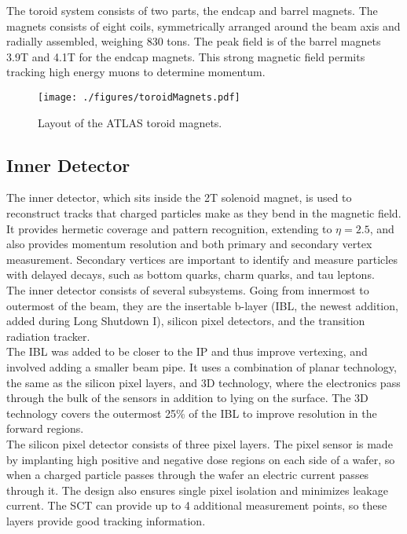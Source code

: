 The toroid system consists of two parts, the endcap and barrel magnets.  The magnets consists of eight coils, symmetrically arranged around the beam axis and radially assembled, weighing 830 tons.  The peak field is of the barrel magnets 3.9T and 4.1T for the endcap magnets.  This strong magnetic field permits tracking high energy muons to determine momentum.\\

\begin{figure}[h!]
  \centering
	\texttt{[image: ./figures/toroidMagnets.pdf]}
\caption{\label{fig:atlasToroids}{ Layout of the ATLAS toroid magnets. }} %
\end{figure}

\subsection{Inner Detector}

The inner detector, which sits inside the 2T solenoid magnet, is used to reconstruct tracks that charged particles make as they bend in the magnetic field.  It provides hermetic coverage and pattern recognition, extending to $\eta=2.5$, and also provides momentum resolution and both primary and secondary vertex measurement.  Secondary vertices are important to identify and measure particles with delayed decays, such as bottom quarks, charm quarks, and tau leptons.  \\

The inner detector consists of several subsystems.  Going from innermost to outermost of the beam, they are the insertable b-layer (IBL, the newest addition, added during Long Shutdown I), silicon pixel detectors, and the transition radiation tracker.  \\

The IBL was added to be closer to the IP and thus improve vertexing, and involved adding a smaller beam pipe.  It uses a combination of planar technology, the same as the silicon pixel layers, and 3D technology, where the electronics pass through the bulk of the sensors in addition to lying on the surface.  The 3D technology covers the outermost 25\% of the IBL to improve resolution in the forward regions. \\ %

The silicon pixel detector consists of three pixel layers.  The pixel sensor is made by implanting high positive and negative dose regions on each side of a wafer, so when a charged particle passes through the wafer an electric current passes through it.  The design also ensures single pixel isolation and minimizes leakage current.  The SCT can provide up to 4 additional measurement points, so these layers provide good tracking information.  \\%


